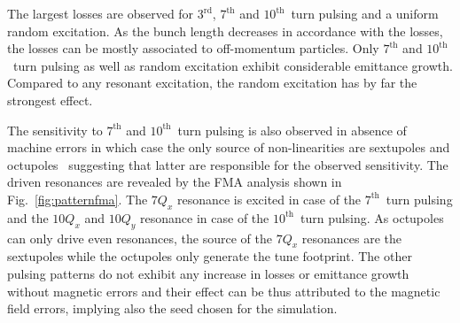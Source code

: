 \documentclass[%
 reprint,
 amsmath,amssymb,
 aps,
prstab,
]{revtex4-1}
\begin{document}
The largest losses are observed for $3^{\mathrm{rd}}$, $7^{\mathrm{th}}$ and $10^{\mathrm{th}}$~turn pulsing and a uniform random excitation. As the bunch length decreases in accordance with the losses, the losses can be mostly associated to off-momentum particles. Only $7^{\mathrm{th}}$ and $10^{\mathrm{th}}$~turn pulsing as well as random excitation exhibit considerable emittance growth. Compared to any resonant excitation, the random excitation has by far the strongest effect.

The sensitivity to $7^{\mathrm{th}}$ and $10^{\mathrm{th}}$~turn pulsing is also observed in absence of machine errors in which case the only source of non-linearities are sextupoles and octupoles~\cite{md_sim_hel_res_ex_fitterer} suggesting that latter are responsible for the observed sensitivity. The driven resonances are revealed by the FMA analysis shown in Fig.~\ref{fig:patternfma}. The $7Q_x$ resonance is excited in case of the $7^{\mathrm{th}}$~turn pulsing and the $10Q_x$ and $10Q_y$ resonance in case of the $10^{\mathrm{th}}$~turn pulsing. As octupoles can only drive even resonances, the source of the $7Q_x$ resonances are the sextupoles while the octupoles only generate the tune footprint. The other pulsing patterns do not exhibit any increase in losses or emittance growth without magnetic errors and their effect can be thus attributed to the magnetic field errors, implying also the seed chosen for the simulation.
\end{document}

